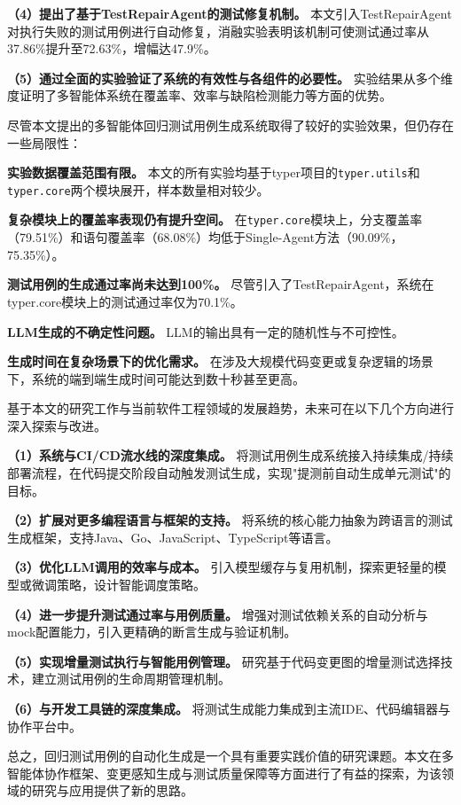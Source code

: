 \begin{conclusion}
  \textbf{（4）提出了基于TestRepairAgent的测试修复机制。} 本文引入TestRepairAgent对执行失败的测试用例进行自动修复，消融实验表明该机制可使测试通过率从37.86\%提升至72.63\%，增幅达47.9\%。

  \textbf{（5）通过全面的实验验证了系统的有效性与各组件的必要性。} 实验结果从多个维度证明了多智能体系统在覆盖率、效率与缺陷检测能力等方面的优势。

  尽管本文提出的多智能体回归测试用例生成系统取得了较好的实验效果，但仍存在一些局限性：

  \textbf{实验数据覆盖范围有限。} 本文的所有实验均基于typer\allowbreak 项目的\texttt{typer.utils}和\allowbreak\texttt{typer.core}两个模块展开，样本数量相对较少。

  \textbf{复杂模块上的覆盖率表现仍有提升空间。} 在\texttt{typer.core}模块上，分支覆盖率（79.51\%）和语句覆盖率（68.08\%）均低于Single-Agent方法（90.09\%，75.35\%）。

  \textbf{测试用例的生成通过率尚未达到100\%。} 尽管引入了TestRepairAgent，系统在typer.core模块上的测试通过率仅为70.1\%。

  \textbf{LLM生成的不确定性问题。} LLM的输出具有一定的随机性与不可控性。

  \textbf{生成时间在复杂场景下的优化需求。} 在涉及大规模代码变更或复杂逻辑的场景下，系统的端到端生成时间可能达到数十秒甚至更高。

  基于本文的研究工作与当前软件工程领域的发展趋势，未来可在以下几个方向进行深入探索与改进。

  \textbf{（1）系统与CI/CD流水线的深度集成。} 将测试用例生成系统接入持续集成/持续部署流程，在代码提交阶段自动触发测试生成，实现"提测前自动生成单元测试"的目标。

  \textbf{（2）扩展对更多编程语言与框架的支持。} 将系统的核心能力抽象为跨语言的测试生成框架，支持Java、Go、JavaScript、TypeScript等语言。

  \textbf{（3）优化LLM调用的效率与成本。} 引入模型缓存与复用机制，探索更轻量的模型或微调策略，设计智能调度策略。

  \textbf{（4）进一步提升测试通过率与用例质量。} 增强对测试依赖关系的自动分析与mock配置能力，引入更精确的断言生成与验证机制。

  \textbf{（5）实现增量测试执行与智能用例管理。} 研究基于代码变更图的增量测试选择技术，建立测试用例的生命周期管理机制。

  \textbf{（6）与开发工具链的深度集成。} 将测试生成能力集成到主流IDE、代码编辑器与协作平台中。

  总之，回归测试用例的自动化生成是一个具有重要实践价值的研究课题。本文在多智能体协作框架、变更感知生成与测试质量保障等方面进行了有益的探索，为该领域的研究与应用提供了新的思路。

\end{conclusion}

